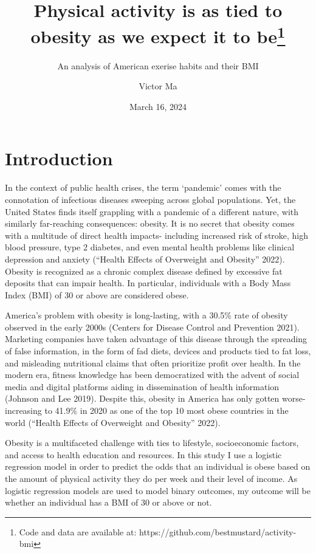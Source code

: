 \documentclass[
  letterpaper,
  DIV=11,
  numbers=noendperiod]{scrartcl}
\title{Physical activity is as tied to obesity as we expect it to
be\thanks{Code and data are available at:
https://github.com/bestmustard/activity-bmi}}
\subtitle{An analysis of American exerise habits and their BMI}
\author{Victor Ma}
\date{March 16, 2024}
\begin{document}
\maketitle
\ifdefined\Shaded\renewenvironment{Shaded}{\begin{tcolorbox}[boxrule=0pt, sharp corners, enhanced, interior hidden, frame hidden, borderline west={3pt}{0pt}{shadecolor}, breakable]}{\end{tcolorbox}}\fi

\hypertarget{introduction}{%
\section{Introduction}\label{introduction}}

In the context of public health crises, the term `pandemic' comes with
the connotation of infectious diseases sweeping across global
populations. Yet, the United States finds itself grappling with a
pandemic of a different nature, with similarly far-reaching
consequences: obesity. It is no secret that obesity comes with a
multitude of direct health impacts- including increased risk of stroke,
high blood pressure, type 2 diabetes, and even mental health problems
like clinical depression and anxiety ({``Health Effects of Overweight
and Obesity''} 2022). Obesity is recognized as a chronic complex disease
defined by excessive fat deposits that can impair health. In particular,
individuals with a Body Mass Index (BMI) of 30 or above are considered
obese.

America's problem with obesity is long-lasting, with a 30.5\% rate of
obesity observed in the early 2000s (Centers for Disease Control and
Prevention 2021). Marketing companies have taken advantage of this
disease through the spreading of false information, in the form of fad
diets, devices and products tied to fat loss, and misleading nutritional
claims that often prioritize profit over health. In the modern era,
fitness knowledge has been democratized with the advent of social media
and digital platforms aiding in dissemination of health information
(Johnson and Lee 2019). Despite this, obesity in America has only gotten
worse- increasing to 41.9\% in 2020 as one of the top 10 most obese
countries in the world ({``Health Effects of Overweight and Obesity''}
2022).

Obesity is a multifaceted challenge with ties to lifestyle,
socioeconomic factors, and access to health education and resources. In
this study I use a logistic regression model in order to predict the
odds that an individual is obese based on the amount of physical
activity they do per week and their level of income. As logistic
regression models are used to model binary outcomes, my outcome will be
whether an individual has a BMI of 30 or above or not.
\end{document}
